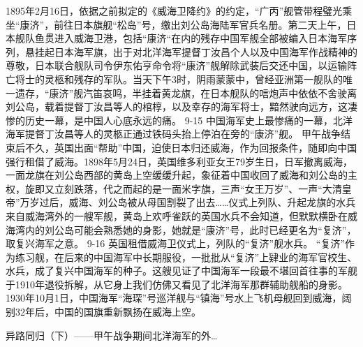 \documentclass[12pt,UTF8]{ctexbook}
\begin{document}
1895年2月16日，依据之前拟定的《威海卫降约》的约定，“广丙”舰管带程璧光乘坐“康济”，前往日本旗舰“松岛”号，缴出刘公岛海陆军官兵名册。第二天上午，日本舰队鱼贯进入威海卫港，包括“康济“在内的残存中国军舰全部被编入日本海军序列，悬挂起日本海军旗，出于对北洋海军提督丁汝昌个人以及中国海军作战精神的尊敬，日本联合舰队司令伊东佑亨命令将“康济”舰解除武装后交还中国，以运输阵亡将士的灵柩和残存的军队。当天下午3时，阴雨蒙蒙中，曾经亚洲第一舰队的唯一遗存，“康济”舰汽笛哀鸣，半挂着黄龙旗，在日本舰队的唁炮声中依依不舍驶离刘公岛，载着提督丁汝昌等人的棺椁，以及幸存的海军将士，黯然驶向远方，这凄惨的历史一幕，是中国人心底永远的痛。
9-15
中国海军史上最惨痛的一幕，北洋海军提督丁汝昌等人的灵柩正通过铁码头抬上停泊在旁的“康济”舰。
甲午战争结束后不久，英国出面“帮助”中国，迫使日本归还威海，作为回报条件，随即向中国强行租借了威海。1898年5月24日，英国维多利亚女王79岁生日，日军撤离威海，一面龙旗在刘公岛西部的黄岛上空缓缓升起，象征着中国收回了威海和刘公岛的主权，旋即又立刻跌落，代之而起的是一面米字旗，三声“女王万岁”、一声“大清皇帝”万岁过后，威海、刘公岛被从母国割裂了出去……仪式上列队、升起龙旗的水兵来自威海湾外的一艘军舰，黄岛上欢呼雀跃的英国水兵不会知道，但默默横卧在威海湾内的刘公岛可能会熟悉她的身影，她就是“康济”号，此时已经更名为“复济”，取复兴海军之意。
9-16 英国租借威海卫仪式上，列队的“复济”舰水兵。
“复济”作为练习舰，在后来的中国海军中长期服役，一批批从“复济”上肄业的海军官校生、水兵，成了复兴中国海军的种子。这艘见证了中国海军一段最不堪回首往事的军舰于1910年退役拆解，从它身上我们仿佛又看见了北洋海军那群辅助舰船的身影。1930年10月1日，中国海军“海琛”号巡洋舰与“镇海”号水上飞机母舰回到威海，阔别32年后，中国的国旗重新飘扬在威海上空。




异路同归（下）——甲午战争期间北洋海军的外…
\end{document}
